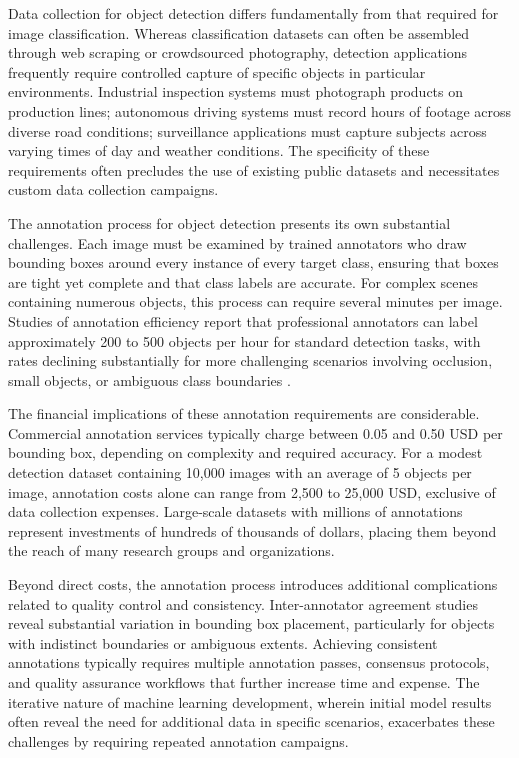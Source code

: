 Data collection for object detection differs fundamentally from that required for image classification. Whereas classification datasets can often be assembled through web scraping or crowdsourced photography, detection applications frequently require controlled capture of specific objects in particular environments. Industrial inspection systems must photograph products on production lines; autonomous driving systems must record hours of footage across diverse road conditions; surveillance applications must capture subjects across varying times of day and weather conditions. The specificity of these requirements often precludes the use of existing public datasets and necessitates custom data collection campaigns.

The annotation process for object detection presents its own substantial challenges. Each image must be examined by trained annotators who draw bounding boxes around every instance of every target class, ensuring that boxes are tight yet complete and that class labels are accurate. For complex scenes containing numerous objects, this process can require several minutes per image. Studies of annotation efficiency report that professional annotators can label approximately 200 to 500 objects per hour for standard detection tasks, with rates declining substantially for more challenging scenarios involving occlusion, small objects, or ambiguous class boundaries \cite{papadopoulos2017extreme}.

The financial implications of these annotation requirements are considerable. Commercial annotation services typically charge between 0.05 and 0.50 USD per bounding box, depending on complexity and required accuracy. For a modest detection dataset containing 10,000 images with an average of 5 objects per image, annotation costs alone can range from 2,500 to 25,000 USD, exclusive of data collection expenses. Large-scale datasets with millions of annotations represent investments of hundreds of thousands of dollars, placing them beyond the reach of many research groups and organizations.

Beyond direct costs, the annotation process introduces additional complications related to quality control and consistency. Inter-annotator agreement studies reveal substantial variation in bounding box placement, particularly for objects with indistinct boundaries or ambiguous extents. Achieving consistent annotations typically requires multiple annotation passes, consensus protocols, and quality assurance workflows that further increase time and expense. The iterative nature of machine learning development, wherein initial model results often reveal the need for additional data in specific scenarios, exacerbates these challenges by requiring repeated annotation campaigns.

